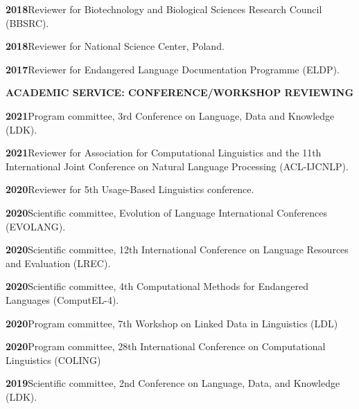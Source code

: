 \documentclass[11pt]{article}
\newcommand{\hangpara}{
 \setlength{\parindent}{0in} %
 \hangindent=0.42in %
}
\begin{document}
\vskip 6pt
\hangpara
{\bf 2018}\hspace{1ex}Reviewer for Biotechnology and Biological Sciences Research Council (BBSRC).

\vskip 6pt
\hangpara
{\bf 2018}\hspace{1ex}Reviewer for National Science Center, Poland.

\vskip 6pt
\hangpara
{\bf 2017}\hspace{1ex}Reviewer for Endangered Language Documentation Programme (ELDP).

\clearpage

\vskip 20pt
\begin{flushleft}
{\bf ACADEMIC SERVICE: CONFERENCE/WORKSHOP REVIEWING}
\end{flushleft}


\hangpara
{\bf 2021}\hspace{1ex}Program committee, 3rd Conference on Language, Data and Knowledge (LDK).

\hangpara
\vskip 6pt
{\bf 2021}\hspace{1ex}Reviewer for Association for Computational Linguistics and the 11th International Joint Conference on Natural Language Processing (ACL-IJCNLP).

\vskip 6pt
\hangpara
{\bf 2020}\hspace{1ex}Reviewer for 5th Usage-Based Linguistics conference.

\vskip 6pt
\hangpara
{\bf 2020}\hspace{1ex}Scientific committee, Evolution of Language International Conferences (EVOLANG).

\vskip 6pt
\hangpara
{\bf 2020}\hspace{1ex}Scientific committee, 12th International Conference on Language Resources and Evaluation (LREC).

\vskip 6pt
\hangpara
{\bf 2020}\hspace{1ex}Scientific committee, 4th Computational Methods for Endangered Languages (ComputEL-4).

\vskip 6pt
\hangpara
{\bf 2020}\hspace{1ex}Program committee, 7th Workshop on Linked Data in Linguistics (LDL)

\vskip 6pt
\hangpara
{\bf 2020}\hspace{1ex}Program committee, 28th International Conference on Computational Linguistics (COLING)

\vskip 6pt
\hangpara
{\bf 2019}\hspace{1ex}Scientific committee, 2nd Conference on Language, Data, and Knowledge (LDK).
\end{document}
